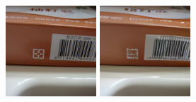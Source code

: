 \begin{figure}[h]
    \begin{minipage}{0.15\textwidth}
        \centering
        \includegraphics[width=\linewidth]{material/origin/374.png}
    \end{minipage}
    \begin{minipage}{0.15\textwidth}
        \centering
        \includegraphics[width=\linewidth]{material/vq/374.png}

\end{minipage}
\end{figure}
